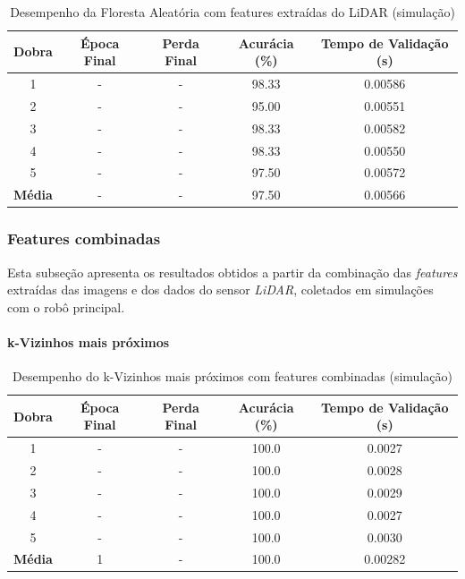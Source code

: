 \begin{table}[H]
\centering
\caption{Desempenho da Floresta Aleatória com features extraídas do LiDAR (simulação)}
\label{tab:floresta_aleatoria_lidar_features}
\begin{tabular}{ccccc}
\hline
\textbf{Dobra} & \textbf{Época Final} & \textbf{Perda Final} & \textbf{Acurácia (\%)} & \textbf{Tempo de Validação (s)} \\
\hline
1 & -   & -        & 98.33 & 0.00586 \\
2 & -   & -        & 95.00 & 0.00551 \\
3 & -   & -        & 98.33 & 0.00582 \\
4 & -   & -        & 98.33 & 0.00550 \\
5 & -   & -        & 97.50 & 0.00572 \\
\hline
\textbf{Média} & - & - & 97.50 & 0.00566 \\
\hline
\end{tabular}
\fonte{}
\end{table}

\subsubsection{Features combinadas}

Esta subseção apresenta os resultados obtidos a partir da combinação das \textit{features} extraídas das imagens e dos dados do sensor \textit{LiDAR}, coletados em simulações com o robô principal.

\paragraph{k-Vizinhos mais próximos}

\begin{table}[H]
\centering
\caption{Desempenho do k-Vizinhos mais próximos com features combinadas (simulação)}
\label{tab:knn_features_combinadas}
\begin{tabular}{ccccc}
\hline
\textbf{Dobra} & \textbf{Época Final} & \textbf{Perda Final} & \textbf{Acurácia (\%)} & \textbf{Tempo de Validação (s)} \\
\hline
1 & - & -       & 100.0 & 0.0027 \\
2 & - & -       & 100.0 & 0.0028 \\
3 & - & -       & 100.0 & 0.0029 \\
4 & - & -       & 100.0 & 0.0027 \\
5 & - & -       & 100.0 & 0.0030 \\
\hline
\textbf{Média} & 1 & -      & 100.0 & 0.00282 \\
\hline
\end{tabular}
\fonte{}
\end{table}

